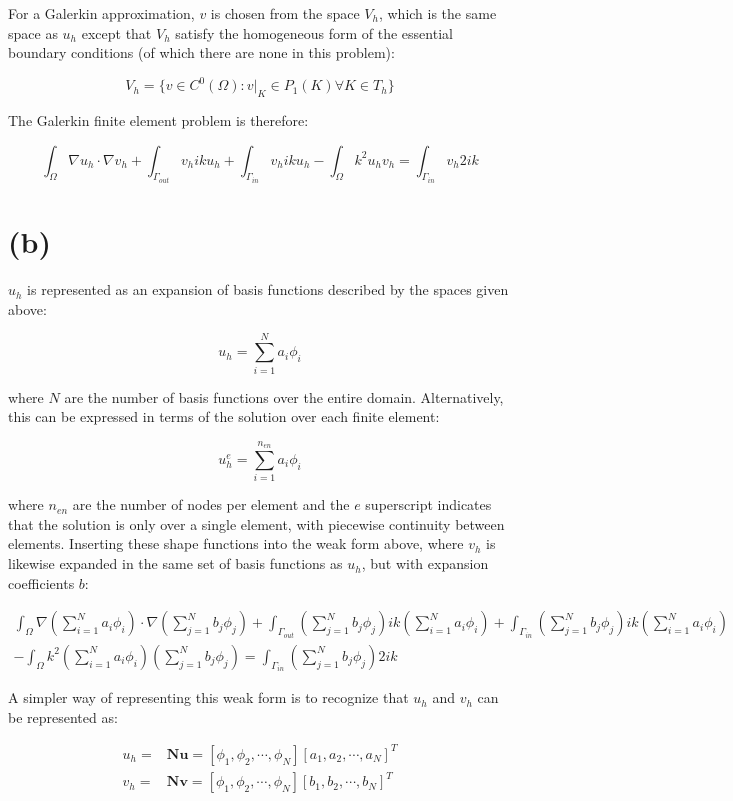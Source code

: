 \documentclass[10pt]{article}
\newcommand{\beq}{\begin{equation}}
\newcommand{\eeq}{\end{equation}}
\newcommand{\beqa}{\begin{equation}\begin{aligned}}
\newcommand{\eeqa}{\end{aligned}\end{equation}}
\begin{document}
For a Galerkin approximation, \(v\) is chosen from the space \(V_h\), which is the same space as \(u_h\) except that \(V_h\) satisfy the homogeneous form of the essential boundary conditions (of which there are none in this problem):

\beq
V_h=\{v\in C^0(\Omega):v\rvert_K\in P_1(K)\forall K\in T_h\}
\eeq

The Galerkin finite element problem is therefore:

\beq
\int_{\Omega}\nabla u_h\cdot\nabla v_h+\int_{\Gamma_{out}}v_hiku_h+\int_{\Gamma_{in}}v_hiku_h-\int_{\Omega}k^2u_hv_h=\int_{\Gamma_{in}}v_h2ik
\eeq

\section{(b)}

\(u_h\) is represented as an expansion of basis functions described by the spaces given above:

\beq
u_h=\sum_{i=1}^{N}a_i\phi_i
\eeq

where \(N\) are the number of basis functions over the entire domain. Alternatively, this can be expressed in terms of the solution over each finite element:

\beq
u_h^e=\sum_{i=1}^{n_{en}}a_i\phi_i
\eeq

where \(n_{en}\) are the number of nodes per element and the \(e\) superscript indicates that the solution is only over a single element, with piecewise continuity between elements. Inserting these shape functions into the weak form above, where \(v_h\) is likewise expanded in the same set of basis functions as \(u_h\), but with expansion coefficients \(b\):

\beqa
\int_{\Omega}\nabla \left(\sum_{i=1}^{N}a_i\phi_i\right)\cdot\nabla \left(\sum_{j=1}^{N}b_j\phi_j\right)+\int_{\Gamma_{out}}\left(\sum_{j=1}^{N}b_j\phi_j\right)ik\left(\sum_{i=1}^{N}a_i\phi_i\right)+\int_{\Gamma_{in}}\left(\sum_{j=1}^{N}b_j\phi_j\right)ik\left(\sum_{i=1}^{N}a_i\phi_i\right)\\
-\int_{\Omega}k^2\left(\sum_{i=1}^{N}a_i\phi_i\right)\left(\sum_{j=1}^{N}b_j\phi_j\right)=\int_{\Gamma_{in}}\left(\sum_{j=1}^{N}b_j\phi_j\right)2ik
\eeqa

A simpler way of representing this weak form is to recognize that \(u_h\) and \(v_h\) can be represented as:

\beqa
u_h=&\textbf{N}\textbf{u}=\left\lbrack\phi_1, \phi_2, \cdots, \phi_N\right\rbrack\left\lbrack a_1, a_2, \cdots, a_N\right\rbrack^T\\
v_h=&\textbf{N}\textbf{v}=\left\lbrack\phi_1, \phi_2, \cdots, \phi_N\right\rbrack\left\lbrack b_1, b_2, \cdots, b_N\right\rbrack^T\\
\eeqa
\end{document}
